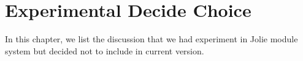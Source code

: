 \chapter{Experimental Decide Choice}

In this chapter, we list the discussion that we had experiment in Jolie module system but decided not to include in current version.

